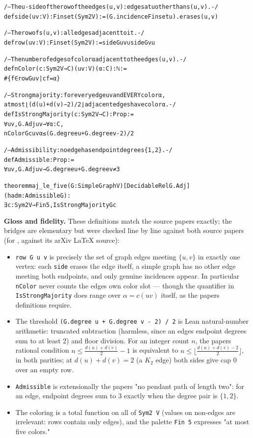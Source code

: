 \documentclass[11pt]{article}
\theoremstyle{definition}
\theoremstyle{remark}
\providecommand{\tightlist}{\setlength{\itemsep}{0pt}\setlength{\parskip}{0pt}}
\begin{document}
{\small
\begin{alltt}
/-- The u-side of the row of the edge s(u,v): edges at u other than s(u,v). -/
def side (u v : V) : Finset (Sym2 V) := (G.incidenceFinset u).erase s(u, v)

/-- The row of s(u,v): all edges adjacent to it. -/
def row (u v : V) : Finset (Sym2 V) := side G u v ∪ side G v u

/-- The number of edges of color α adjacent to the edge s(u,v). -/
def nColor (c : Sym2 V → C) (u v : V) (α : C) : ℕ :=
  #\{f ∈ row G u v | c f = α\}

/-- Strong majority: for every edge uv and EVERY color α,
at most ⌊(d(u)+d(v)−2)/2⌋ adjacent edges have color α. -/
def IsStrongMajority (c : Sym2 V → C) : Prop :=
  ∀ u v, G.Adj u v → ∀ α : C,
    nColor G c u v α ≤ (G.degree u + G.degree v - 2) / 2

/-- Admissibility: no edge has endpoint degrees \{1,2\}. -/
def Admissible : Prop :=
  ∀ u v, G.Adj u v → G.degree u + G.degree v ≠ 3

theorem maj_le_five (G : SimpleGraph V) [DecidableRel G.Adj]
    (hadm : Admissible G) :
    ∃ c : Sym2 V → Fin 5, IsStrongMajority G c
\end{alltt}
}

\textbf{Gloss and fidelity.} These definitions match the source papers exactly; the bridges are elementary but were checked line by line against both source papers (for \cite{APS}, against its arXiv LaTeX source):

\begin{itemize}
\tightlist
\item
  \texttt{row\ G\ u\ v} is precisely the set of graph edges meeting \(\{u, v\}\) in exactly one vertex: each \texttt{side} erases the edge itself, a simple graph has no other edge meeting both endpoints, and only genuine incidences appear. In particular \texttt{nColor} never counts the edge\textquotesingle s own color slot --- though the quantifier in \texttt{IsStrongMajority} does range over \(\alpha = c(uv)\) itself, as the papers\textquotesingle{} definitions require.
\item
  The threshold \texttt{(G.degree\ u\ +\ G.degree\ v\ -\ 2)\ /\ 2} is Lean natural-number arithmetic: truncated subtraction (harmless, since an edge\textquotesingle s endpoint degrees sum to at least 2) and floor division. For an integer count \(n\), the papers\textquotesingle{} rational condition \(n \le \frac{d(u)+d(v)}{2} - 1\) is equivalent to \(n \le \lfloor\frac{d(u)+d(v)-2}{2}\rfloor\), in both parities; at \(d(u)+d(v) = 2\) (a \(K_2\) edge) both sides give cap 0 over an empty row.
\item
  \texttt{Admissible} is extensionally the papers\textquotesingle{} "no pendant path of length two": for an edge, endpoint degrees sum to 3 exactly when the degree pair is \(\{1,2\}\).
\item
  The coloring is a total function on all of \texttt{Sym2\ V} (values on non-edges are irrelevant: rows contain only edges), and the palette \texttt{Fin\ 5} expresses "at most five colors."
\end{itemize}
\end{document}
